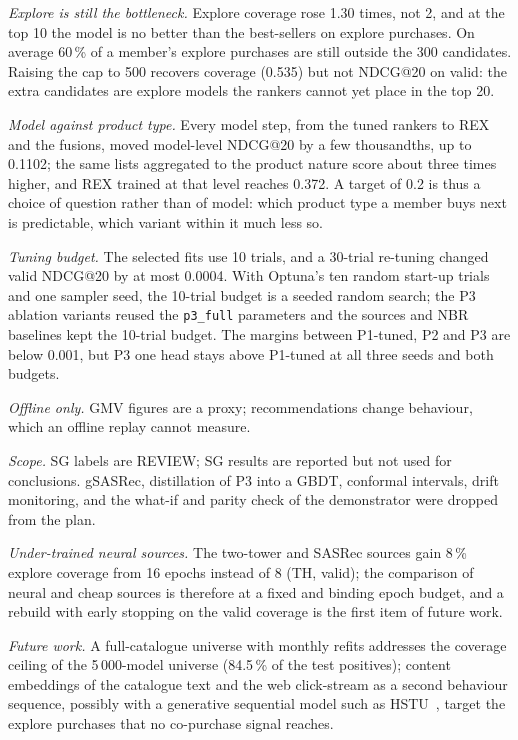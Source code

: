 \documentclass{ieeeaccess}
\begin{document}
\textit{Explore is still the bottleneck.} Explore coverage rose 1.30 times, not 2, and at the top 10 the model is no better than the
best-sellers on explore purchases. On average 60\,\% of a member's explore purchases are still outside the 300 candidates. Raising the cap to 500
recovers coverage (0.535) but not NDCG@20 on valid: the extra candidates are explore models the rankers cannot yet place in the top
20.

\textit{Model against product type.} Every model step, from the tuned rankers to REX and the fusions, moved model-level NDCG@20 by a
few thousandths, up to 0.1102; the same lists aggregated to the product nature score about three times higher, and REX trained at
that level reaches 0.372. A target of 0.2 is thus a choice of question rather than of model: which product type a member buys next
is predictable, which variant within it much less so.

\textit{Tuning budget.} The selected fits use 10 trials, and a 30-trial re-tuning changed valid NDCG@20 by at most 0.0004. With
Optuna's ten random start-up trials and one sampler seed, the 10-trial budget is a seeded random search; the P3 ablation variants
reused the \texttt{p3\_full} parameters and the sources and NBR baselines kept the 10-trial budget. The margins between P1-tuned, P2
and P3 are below 0.001, but P3 one head stays above P1-tuned at all three seeds and both budgets.

\textit{Offline only.} GMV figures are a proxy; recommendations change behaviour, which an offline replay cannot measure.

\textit{Scope.} SG labels are REVIEW; SG results are reported but not used for conclusions. gSASRec, distillation of P3 into a GBDT,
conformal intervals, drift monitoring, and the what-if and parity check of the demonstrator were dropped from the plan.

\textit{Under-trained neural sources.} The two-tower and SASRec sources gain 8\,\% explore coverage from 16 epochs instead of 8
(TH, valid); the comparison of neural and cheap sources is therefore at a fixed and binding epoch budget, and a rebuild with early
stopping on the valid coverage is the first item of future work.

\textit{Future work.} A full-catalogue universe with monthly refits addresses the coverage ceiling of the 5\,000-model universe
(84.5\,\% of the test positives);
content embeddings of the catalogue text and the web click-stream as a second behaviour sequence, possibly with a generative sequential
model such as HSTU~\cite{zhai2024hstu}, target the explore purchases that no co-purchase signal reaches.
\end{document}
